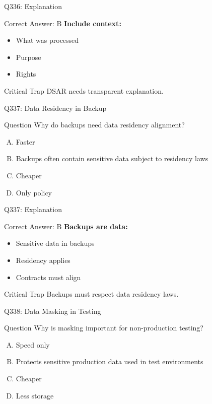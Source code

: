 \documentclass{beamer}
\begin{document}
	\begin{frame}{Q336: Explanation}
		\begin{block}{Correct Answer: B}
			\textbf{Include context:}
			\begin{itemize}
				\item What was processed
				\item Purpose
				\item Rights
			\end{itemize}
		\end{block}
		\begin{alertblock}{Critical Trap}
			DSAR needs transparent explanation.
		\end{alertblock}
	\end{frame}
	
	\begin{frame}{Q337: Data Residency in Backup}
		\begin{block}{Question}
			Why do backups need data residency alignment?
		\end{block}
		\begin{enumerate}[(A)]
			\item Faster
			\item Backups often contain sensitive data subject to residency laws
			\item Cheaper
			\item Only policy
		\end{enumerate}
	\end{frame}
	
	\begin{frame}{Q337: Explanation}
		\begin{block}{Correct Answer: B}
			\textbf{Backups are data:}
			\begin{itemize}
				\item Sensitive data in backups
				\item Residency applies
				\item Contracts must align
			\end{itemize}
		\end{block}
		\begin{alertblock}{Critical Trap}
			Backups must respect data residency laws.
		\end{alertblock}
	\end{frame}
	
	\begin{frame}{Q338: Data Masking in Testing}
		\begin{block}{Question}
			Why is masking important for non-production testing?
		\end{block}
		\begin{enumerate}[(A)]
			\item Speed only
			\item Protects sensitive production data used in test environments
			\item Cheaper
			\item Less storage
		\end{enumerate}
	\end{frame}
	
\end{document}
